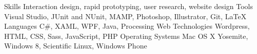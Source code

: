   \begin{cvskills}
  	\cvskill
		{Skills}
		{Interaction design, rapid prototyping, user research, website design}
	\cvskill
		{Tools}
		{Visual Studio, JUnit and NUnit, MAMP, Photoshop, Illustrator, Git, LaTeX}
    \cvskill
      {Languages}
      {C\#, XAML, WPF, Java, Processing}
  	\cvskill
		{Web Technologies}
		{Wordpress, HTML, CSS, Sass, JavaScript, PHP}
  	\cvskill
		{Operating Systems}
		{Mac OS X Yosemite, Windows 8, Scientific Linux, Windows Phone}
  \end{cvskills}
